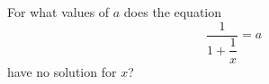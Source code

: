 For what values of $a$ does the equation
\[
\dfrac{1}{1+\dfrac{1}{x}}=a
\]
have no solution for $x$?
